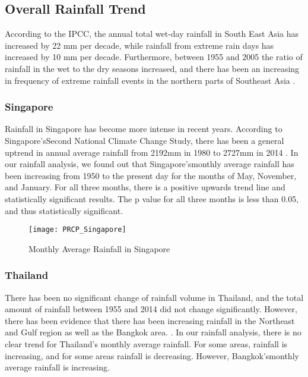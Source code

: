 

\subsection{Overall Rainfall Trend}
According to the IPCC, the annual total wet-day rainfall in South East Asia has increased by 22 mm per decade, while rainfall from extreme rain days has increased by 10 mm per decade. Furthermore, between 1955 and 2005 the ratio of rainfall in the wet to the dry seasons increased, and there has been an increasing in frequency of extreme rainfall events in the northern parts of Southeast Asia \citep{TBD}.

\subsubsection{Singapore}
Rainfall in Singapore has become more intense in recent years. According to Singapore'sSecond National Climate Change Study, there has been a general uptrend in annual average rainfall from 2192mm in 1980 to 2727mm in 2014 \citep{singaporeclimatechange}. In our rainfall analysis, we found out that  Singapore'smonthly average rainfall has been increasing from 1950 to the present day for the months of May, November, and January. For all three months, there is a positive upwards trend line and statistically significant results. The p value for all three months is less than 0.05, and thus statistically significant.   

\begin{figure}[h!]
\centering
  \texttt{[image: PRCP\_Singapore]}
  \caption{Monthly Average Rainfall in Singapore}
  \label{fig:PCRP_singapore}
\end{figure}


\subsubsection{Thailand} 
There has been no significant change of rainfall volume in Thailand, and the total amount of rainfall between 1955 and 2014 did not change significantly. However, there has been evidence that there has been increasing rainfall in the Northeast and Gulf region as well as the Bangkok area. \citep{bkkweather}. In our rainfall analysis, there is no clear trend for Thailand's monthly average rainfall. For some areas, rainfall is increasing, and for some areas rainfall is decreasing. However, Bangkok'smonthly average rainfall is increasing. 

